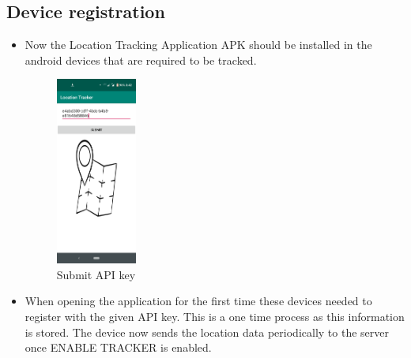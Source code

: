 \documentclass{article}
\begin{document}
\subsection{Device registration}
\begin{itemize}
\item Now the Location Tracking Application APK should be installed in the android devices that are required to be tracked.
\begin{figure}[h]
\centering
    \includegraphics[width=0.25\textwidth]{images/submitAPI.png}
    \caption{Submit API key}
\end{figure}
\item When opening the application for the first time these devices needed to register with the given API key. This is a one time process as this information is stored. The device now sends the location data periodically to the server once ENABLE TRACKER is enabled.
\begin{figure}[!tbp]
  \centering
  \begin{minipage}[b]{0.4\textwidth}
  \centering

\end{minipage}
\end{figure}
\end{itemize}
\end{document}
